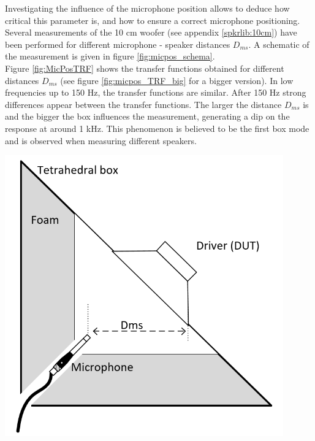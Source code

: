 \documentclass{report}
\begin{document}
Investigating the influence of the microphone position allows to deduce how critical this parameter is, and how to ensure a correct microphone positioning. Several measurements of the 10 cm woofer (see appendix \ref{spkrlib:10cm}) have been performed for different microphone - speaker distances $D_{ms}$. A schematic of the measurement is given in figure \ref{fig:micpos_schema}.  \\

Figure \ref{fig:MicPosTRF} shows the transfer functions obtained for different distances $D_{ms}$ (see figure \ref{fig:micpos_TRF_big} for a bigger version). In low frequencies up to 150 Hz, the transfer functions are similar. After 150 Hz strong differences appear between the transfer functions. The larger the distance $D_{ms}$ is and the bigger the box influences the measurement, generating a dip on the response at around 1 kHz. This phenomenon is believed to be the first box mode and is observed when measuring different speakers. \\
\begin{minipage}{0.35\textwidth}
\begin{center}
	\includegraphics[width=0.9\textwidth]{RoomComp/Mic_Pos_Schm} 
    \captionsetup{hypcap=false} 
	\label{fig:micpos_schema}
\end{center}
\end{minipage}
\end{document}
